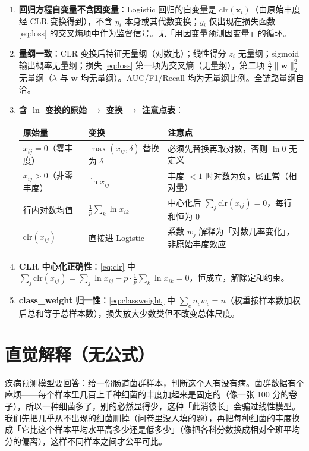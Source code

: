 \documentclass{internal-report}
\begin{document}
\begin{enumerate}
  \item \textbf{回归方程自变量不含因变量}：Logistic 回归的自变量是 $\mathrm{clr}(\mathbf{x}_i)$（由原始丰度经 CLR 变换得到），不含 $y_i$ 本身或其代数变换；$y_i$ 仅出现在损失函数 \eqref{eq:loss} 的交叉熵项中作为监督信号。无「用因变量预测因变量」的循环。
  \item \textbf{量纲一致}：CLR 变换后特征无量纲（对数比）；线性得分 $z_i$ 无量纲；sigmoid 输出概率无量纲；损失 \eqref{eq:loss} 第一项为交叉熵（无量纲），第二项 $\frac{\lambda}{2}\lVert\mathbf{w}\rVert_2^2$ 无量纲（$\lambda$ 与 $\mathbf{w}$ 均无量纲）。AUC/F1/Recall 均为无量纲比例。全链路量纲自洽。
  \item \textbf{含 $\ln$ 变换的原始 $\to$ 变换 $\to$ 注意点表}：
  \begin{center}
  \footnotesize
  \begin{tabular}{p{3.4cm}p{4.6cm}p{5.4cm}}
  \toprule
  原始量 & 变换 & 注意点 \\
  \midrule
  $x_{ij}=0$（零丰度） & $\max(x_{ij},\delta)$ 替换为 $\delta$ & 必须先替换再取对数，否则 $\ln 0$ 无定义 \\
  $x_{ij}>0$（非零丰度） & $\ln x_{ij}$ & 丰度 $<1$ 时对数为负，属正常（相对量） \\
  行内对数均值 & $\frac{1}{p}\sum_k\ln x_{ik}$ & 中心化后 $\sum_j\mathrm{clr}(x_{ij})=0$，每行和恒为 0 \\
  $\mathrm{clr}(x_{ij})$ & 直接进 Logistic & 系数 $w_j$ 解释为「对数几率变化」，非原始丰度效应 \\
  \bottomrule
  \end{tabular}
  \end{center}
  \item \textbf{CLR 中心化正确性}：\eqref{eq:clr} 中 $\sum_j\mathrm{clr}(x_{ij})=\sum_j\ln x_{ij}-p\cdot\frac{1}{p}\sum_k\ln x_{ik}=0$，恒成立，解除定和约束。
  \item \textbf{class\_weight 归一性}：\eqref{eq:classweight} 中 $\sum_c n_c w_c = n$（权重按样本数加权后总和等于总样本数），损失放大少数类但不改变总体尺度。
\end{enumerate}

\section{直觉解释（无公式）}

疾病预测模型要回答：给一份肠道菌群样本，判断这个人有没有病。菌群数据有个麻烦——每个样本里几百上千种细菌的丰度加起来是固定的（像一张 100 分的卷子），所以一种细菌多了，别的必然显得少，这种「此消彼长」会骗过线性模型。我们先把几乎从不出现的细菌删掉（问卷里没人填的题），再把每种细菌的丰度换成「它比这个样本平均水平高多少还是低多少」（像把各科分数换成相对全班平均分的偏离），这样不同样本之间才公平可比。
\end{document}

